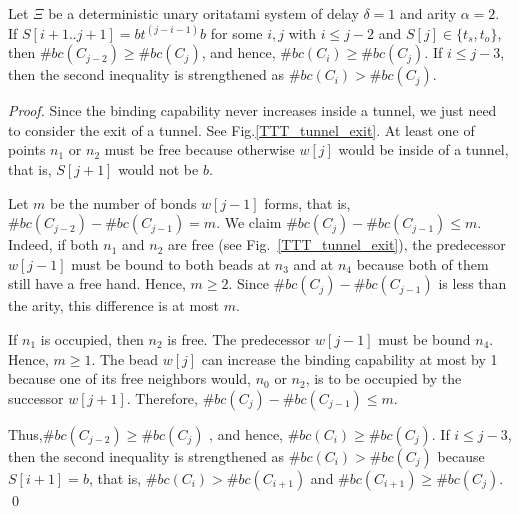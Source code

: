 
\begin{lemma}
\label{TTT_exit}
Let $\Xi$ be a deterministic unary oritatami system of delay $\delta = 1$ and arity $\alpha =2$.
If $S[i+1..j+1] = bt^{(j-i-1)}b$ for some $i,j$ with $i \leq j-2$ and $S[j] \in \{ t_s, t_o\}$, then $\#bc(C_{j-2}) \geq \#bc(C_j)$, and hence, $\#bc(C_{i}) \geq \#bc(C_j)$.
If $i \leq j-3$, then the second inequality is strengthened as $\#bc(C_{i}) > \#bc(C_{j})$.
\end{lemma}

\begin{proof}%
Since the binding capability never increases inside a tunnel, we just need to consider the exit of a tunnel.
See Fig.\ref{TTT_tunnel_exit}. 
At least one of points $n_1$ or $n_2$ must be free because otherwise $w[j]$ would be inside of a tunnel, that is, $S[j+1]$ would not be $b$.



Let $m$ be the number of bonds $w[j-1]$ forms, that is, $\#bc(C_{j-2}) - \#bc(C_{j-1}) = m$.
We claim $\#bc(C_{j}) - \#bc(C_{j-1}) \leq m$.
Indeed, if both $n_1$ and $n_2$ are free (see Fig.~\ref{TTT_tunnel_exit}), the predecessor $w[j-1]$ must be bound to both beads at $n_3$ and at $n_4$ because both of them still have a free hand.
Hence, $m \geq 2$.
Since $\#bc(C_{j}) - \#bc(C_{j-1})$ is less than the arity, this difference is at most $m$.

If $n_1$ is occupied, then $n_2$ is free.
The predecessor $w[j-1]$ must be bound $n_4$.
Hence,  $m \geq 1$.
The bead $w[j]$ can increase the binding capability at most by 1 because one of its free neighbors would, $n_0$ or $n_2$, is to be occupied by the successor $w[j+1]$.
Therefore, $\#bc(C_{j}) - \#bc(C_{j-1}) \leq m$.
  


Thus,$\#bc(C_{j-2}) \geq \#bc(C_j)$ , and hence, $\#bc(C_{i}) \geq \#bc(C_j)$.
If $i \leq j-3$, then the second inequality is strengthened as $\#bc(C_{i}) > \#bc(C_{j})$ because $S[i+1] = b$, that is, $\#bc(C_{i}) > \#bc(C_{i+1})$ and $\#bc(C_{i+1}) \geq \#bc(C_j)$. \qed


\end{proof}

